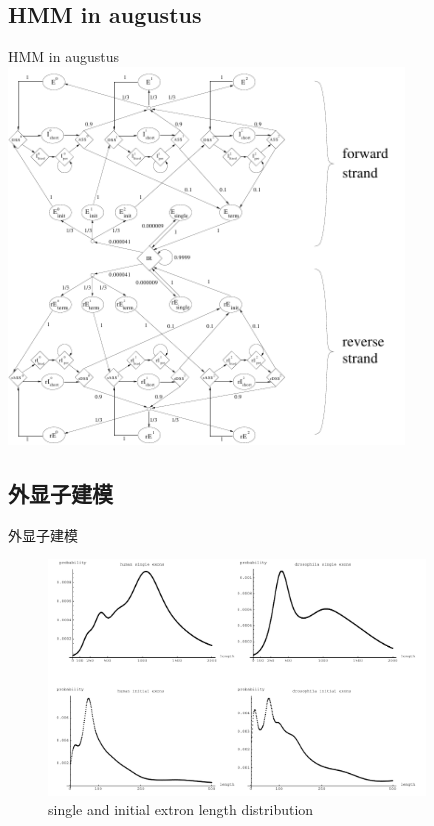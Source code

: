 \documentclass[handout]{beamer}
\begin{document}
\subsection{HMM in augustus}
\begin{frame}{HMM in augustus}
\includegraphics[height=10cm]{../pic/big-scheme.png}
\end{frame}

\subsection{外显子建模}
\begin{frame}{外显子建模}
\begin{figure}
\centering
\includegraphics[width=10cm]{../pic/extron-length-1}
\caption{single and initial extron length distribution}
\end{figure}
\end{frame}
\end{document}
